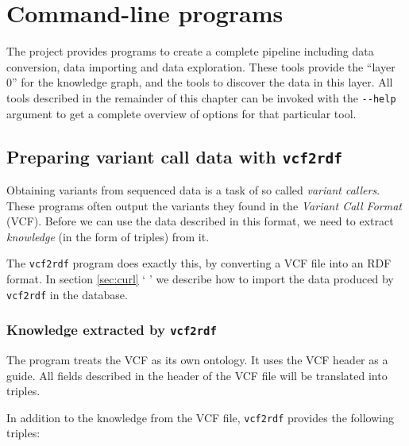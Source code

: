\chapter{Command-line programs}
\label{chap:command-line}

  The project provides programs to create a complete pipeline including
  data conversion, data importing and data exploration.  These tools
  provide the ``layer 0'' for the knowledge graph, and the tools to
  discover the data in this layer.   All tools described in the remainder
  of this chapter can be invoked with the \texttt{-{}-help} argument to
  get a complete overview of options for that particular tool.

\section{Preparing variant call data with \texttt{vcf2rdf}}
\label{sec:vcf2rdf}

  Obtaining variants from sequenced data is a task of so called
  \emph{variant callers}.  These programs often output the variants they found
  in the \emph{Variant Call Format} (VCF).  Before we can use the data described
  in this format, we need to extract \emph{knowledge} (in the form of triples)
  from it.

  The \texttt{vcf2rdf} program does exactly this, by converting a VCF file
  into an RDF format.  In section \ref{sec:curl} {\color{LinkGray}`%
  '} we describe how to import the data produced by \texttt{vcf2rdf} in the
  database.

\subsection{Knowledge extracted by \texttt{vcf2rdf}}

  The program treats the VCF as its own ontology.  It uses the VCF header as
  a guide.  All fields described in the header of the VCF file will be
  translated into triples.

  In addition to the knowledge from the VCF file, \texttt{vcf2rdf} provides the
  following triples:

